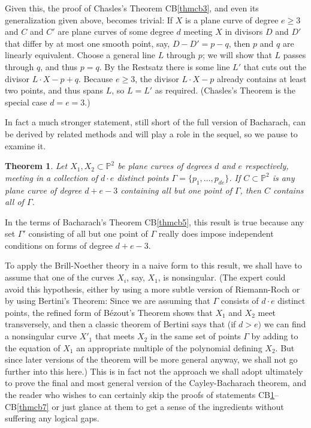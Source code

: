 \documentclass{bull-l}
\theoremstyle{pplain}
\newtheorem{thmcb}{Theorem}
\theoremstyle{definition}
\begin{document}
Given this, the proof of Chasles's Theorem CB\ref{thmcb3}, and even its
generalization given above, becomes trivial: If $X$ is a plane curve of degree
$e\ge 3$ and $C$ and $C'$ are plane curves of some degree $d$ meeting $X$
in divisors $D$ and $D'$ that differ by at most one smooth point, say,
$D-D'=p-q$, then $p$ and $q$ are linearly equivalent.  Choose a general line
$L$ through $p$; we will show that $L$ passes through $q$, and thus $p=q$.  By
the Restsatz there is some line $L'$ that cuts out the divisor  $L\cdot X-p+q$. 
Because $e\ge 3$, the divisor $L\cdot X-p$ already contains at least two
points, and thus spans $L$, so $L=L'$ as required.  (Chasles's Theorem is the
special case $d=e=3$.)

In fact a much stronger statement, still short of the full version of
Bacharach, can be derived by related methods and will play a role in the
sequel, so we pause to examine it.  

\begin{thmcb}  \label{thmcb4}
Let $X_1,X_2\subset \mathbb{P}^2$ be plane curves of degrees $d$ and $e$
respectively, meeting in a collection of $d\cdot e$ distinct points
$\Gamma=\{p_1,\dots,p_{de}\}$.  If $C\subset \mathbb{P}^2$ is any plane curve
of degree $d+e-3$ containing all but one point of $\Gamma$, then $C$ contains
all of $\Gamma$.
\end{thmcb}

In the terms of Bacharach's Theorem CB\ref{thmcb5}, this result is true because
any set $\Gamma'$ consisting of all but one point of $\Gamma$ really does
impose independent conditions on forms of degree $d+e-3$.

To apply the Brill-Noether theory in a naive form to this result, we shall have
to assume that one of the curves  $X_i$, say, $X_1$, is nonsingular.  (The
expert could avoid this hypothesis, either by using a more subtle version of 
Riemann-Roch or by using Bertini's Theorem: Since we are assuming  that $\Gamma$
consists of $d\cdot e$ distinct points, the refined form of B\'ezout's Theorem
shows that $X_1$ and $X_2$ meet transversely, and then a classic theorem  of
Bertini says that (if $d>e)$ we can find a nonsingular curve $X'_1$ that meets
$X_2$ in the same set of points $\Gamma$ by adding to the equation of $X_1$ an
appropriate multiple of the polynomial defining $X_2$.  But since later
versions of the theorem will be more general anyway, we shall not go further
into this here.)  This is in fact not the approach we shall adopt ultimately to
prove the final and most general version of the Cayley-Bacharach theorem, and
the reader who wishes to can certainly skip the proofs of statements
CB\ref{thmcb4}--CB\ref{thmcb7} or just glance at them to get a sense of the
ingredients without suffering any logical gaps.
\end{document}
